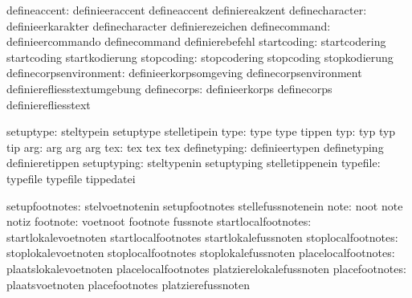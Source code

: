                  defineaccent:  definieeraccent              defineaccent
                                definiereakzent
              definecharacter:  definieerkarakter            definecharacter
                                definierezeichen
                definecommand:  definieercommando            definecommand
                                definierebefehl
                  startcoding:  startcodering                startcoding
                                startkodierung
                   stopcoding:  stopcodering                 stopcoding
                                stopkodierung
       definecorpsenvironment:  definieerkorpsomgeving       definecorpsenvironment
                                definierefliesstextumgebung
                  definecorps:  definieerkorps               definecorps
                                definierefliesstext

                    setuptype:  steltypein                   setuptype
                                stelletipein
                         type:  type                         type
                                tippen
                          typ:  typ                          typ
                                tip
                          arg:  arg                          arg
                                arg
                          tex:  tex                          tex
                                tex
                 definetyping:  definieertypen               definetyping
                                definieretippen
                  setuptyping:  steltypenin                  setuptyping
                                stelletippenein
                     typefile:  typefile                     typefile
                                tippedatei

               setupfootnotes:  stelvoetnotenin              setupfootnotes
                                stellefussnotenein
                         note:  noot                         note
                                notiz
                     footnote:  voetnoot                     footnote
                                fussnote
          startlocalfootnotes:  startlokalevoetnoten         startlocalfootnotes
                                startlokalefussnoten
           stoplocalfootnotes:  stoplokalevoetnoten          stoplocalfootnotes
                                stoplokalefussnoten
          placelocalfootnotes:  plaatslokalevoetnoten        placelocalfootnotes
                                platzierelokalefussnoten
               placefootnotes:  plaatsvoetnoten              placefootnotes
                                platzierefussnoten

